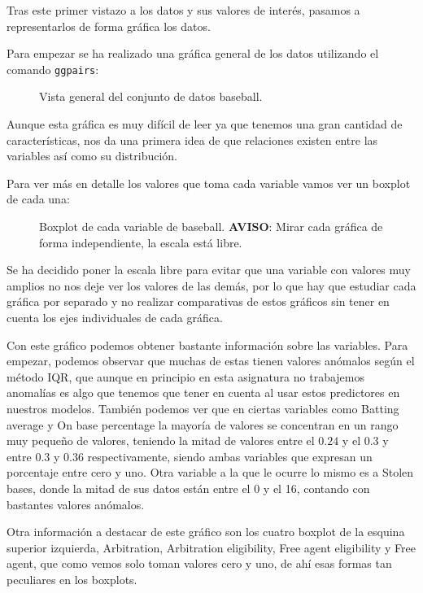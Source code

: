 Tras este primer vistazo a los datos y sus valores de interés, pasamos a representarlos de forma gráfica los datos.

Para empezar se ha realizado una gráfica general de los datos utilizando el comando \texttt{ggpairs}:

\begin{figure}[H]
	\centering
	
	\caption{Vista general del conjunto de datos baseball.}
	\label{fig:vista_general_baseball}
\end{figure}

Aunque esta gráfica es muy difícil de leer ya que tenemos una gran cantidad de características, nos da una primera idea de que relaciones existen entre las variables así como su distribución.

Para ver más en detalle los valores que toma cada variable vamos ver un boxplot de cada una:

\begin{figure}[H]
	\centering
	
	\caption{Boxplot de cada variable de baseball. \textbf{AVISO}: Mirar cada gráfica de forma independiente, la escala está libre.}
	\label{fig:boxplot_baseball}
\end{figure}

Se ha decidido poner la escala libre para evitar que una variable con valores muy amplios no nos deje ver los valores de las demás, por lo que hay que estudiar cada gráfica por separado y no realizar comparativas de estos gráficos sin tener en cuenta los ejes individuales de cada gráfica.

Con este gráfico podemos obtener bastante información sobre las variables. Para empezar, podemos observar que muchas de estas tienen valores anómalos según el método IQR, que aunque en principio en esta asignatura no trabajemos anomalías es algo que tenemos que tener en cuenta al usar estos predictores en nuestros modelos. También podemos ver que en ciertas variables como Batting average y On base percentage la mayoría de valores se concentran en un rango muy pequeño de valores, teniendo la mitad de valores entre el $0.24$ y el $0.3$ y entre $0.3$ y $0.36$ respectivamente, siendo ambas variables que expresan un porcentaje entre cero y uno. Otra variable a la que le ocurre lo mismo es a Stolen bases, donde la mitad de sus datos están entre el 0 y el 16, contando con bastantes valores anómalos.

Otra información a destacar de este gráfico son los cuatro boxplot de la esquina superior izquierda, Arbitration, Arbitration eligibility, Free agent eligibility y Free agent, que como vemos solo toman valores cero y uno, de ahí esas formas tan peculiares en los boxplots.



